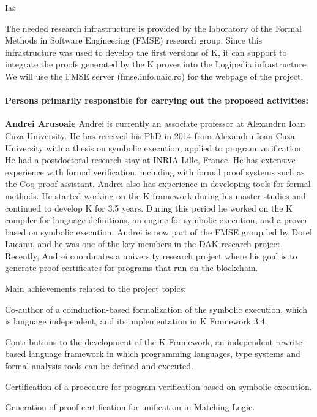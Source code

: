\begin{sitedescription}{Ias}
\begin{compactitem}
\item The needed research infrastructure is provided by the laboratory of the Formal Methods in Software Engineering (FMSE) research group. Since this infrastructure was used to develop the first versions of K, it can support to integrate the proofs generated by the K prover into the Logipedia infrastructure. We will use the FMSE server (fmse.info.uaic.ro) for the webpage of the project. 
\end{compactitem}

\paragraph*{Persons primarily responsible for carrying out the proposed activities:}

\begin{compactitem} %
\item{\bf Andrei Arusoaie}
Andrei is currently an associate professor at Alexandru Ioan Cuza University. He has received his PhD in 2014 from Alexandru Ioan Cuza University with a thesis on symbolic execution, applied to program verification. He had a postdoctoral research stay at INRIA Lille, France. He has extensive experience with formal verification, including with formal proof systems such as the Coq proof assistant. Andrei also has experience in developing tools for formal methods. He started working on the K framework during his master studies and continued to develop K for 3.5 years. During this period he worked on the K compiler for language definitions, an engine for symbolic execution, and a prover based on symbolic execution. 
Andrei is now part of the FMSE group led by Dorel Lucanu, and he was one of the key members in the DAK research project. Recently, Andrei coordinates a university  research project where his goal is to generate proof certificates for programs that run on the blockchain.

Main achievements related to the project topics:
\begin{compactitem}
\item Co-author of a coinduction-based formalization of the symbolic execution, which is language independent, and its implementation in K Framework 3.4.
\item Contributions to the development of the K Framework, an independent rewrite-based language framework in which programming languages, type systems and formal analysis tools can be defined and executed.
\item Certification of a procedure for program verification based on symbolic execution.
\item Generation of proof certification for unification in Matching Logic.
\end{compactitem}


\end{compactitem}
\end{sitedescription}
